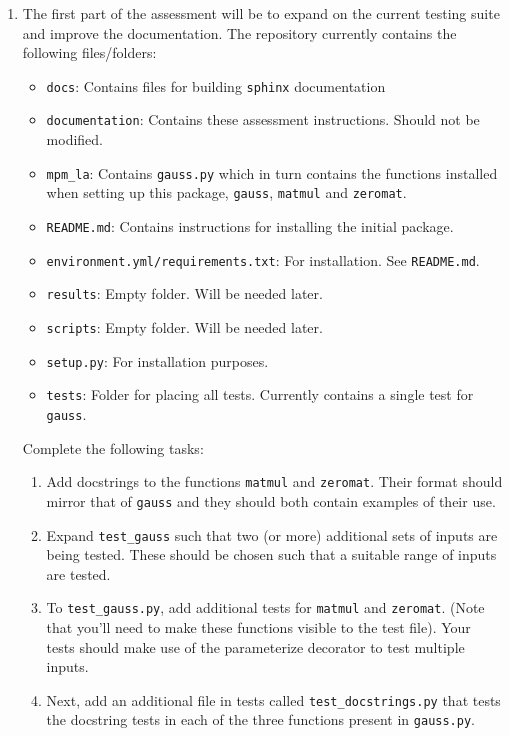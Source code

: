 \documentclass[a4paper,11pt]{article}
\begin{document}
\begin{enumerate}
\item The first part of the assessment will be to expand on the current testing suite and improve the
documentation. The repository currently contains the following files/folders:
\begin{itemize}
 \item \texttt{docs}: Contains files for building \texttt{sphinx} documentation
 \item \texttt{documentation}: Contains these assessment instructions. Should not be modified.
 \item \texttt{mpm\_la}: Contains \texttt{gauss.py} which in turn contains the functions installed when setting up this package, \texttt{gauss}, \texttt{matmul} and \texttt{zeromat}.
 \item \texttt{README.md}: Contains instructions for installing the initial package.
 \item \texttt{environment.yml/requirements.txt}: For installation. See \texttt{README.md}.
 \item \texttt{results}: Empty folder. Will be needed later.
 \item \texttt{scripts}: Empty folder. Will be needed later.
 \item \texttt{setup.py}: For installation purposes.
 \item \texttt{tests}: Folder for placing all tests. Currently contains a single test for \texttt{gauss}.
\end{itemize}
Complete the following tasks:
\begin{enumerate}
 \item Add docstrings to the functions \texttt{matmul} and \texttt{zeromat}. Their format should
 mirror that of \texttt{gauss} and they should both contain examples of their use.
 \item Expand \texttt{test\_gauss} such that two (or more) additional sets of inputs are being tested.
 These should be chosen such that a suitable range of inputs are tested.
 \item To \texttt{test\_gauss.py}, add additional tests for \texttt{matmul} and \texttt{zeromat}.
 (Note that you'll need to make these functions visible to the test file). Your tests
 should make use of the parameterize decorator to test multiple inputs.
 \item Next, add an additional file in tests called \newline
 \texttt{test\_docstrings.py} that
 tests the docstring tests in each of the three functions present in \texttt{gauss.py}.

\end{enumerate}
\end{enumerate}
\end{document}
